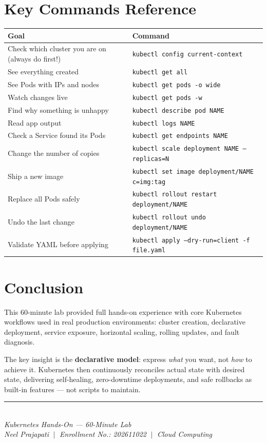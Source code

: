 \documentclass[12pt,a4paper]{report}
\begin{document}
\section*{Key Commands Reference}
\begin{center}
\begin{tabular}{ll}
\toprule
Goal & Command \\
\midrule
Check which cluster you are on (always do first!) & \texttt{kubectl config current-context} \\
See everything created                             & \texttt{kubectl get all} \\
See Pods with IPs and nodes                        & \texttt{kubectl get pods -o wide} \\
Watch changes live                                 & \texttt{kubectl get pods -w} \\
Find why something is unhappy                      & \texttt{kubectl describe pod NAME} \\
Read app output                                    & \texttt{kubectl logs NAME} \\
Check a Service found its Pods                     & \texttt{kubectl get endpoints NAME} \\
Change the number of copies                        & \texttt{kubectl scale deployment NAME --replicas=N} \\
Ship a new image                                   & \texttt{kubectl set image deployment/NAME c=img:tag} \\
Replace all Pods safely                            & \texttt{kubectl rollout restart deployment/NAME} \\
Undo the last change                               & \texttt{kubectl rollout undo deployment/NAME} \\
Validate YAML before applying                      & \texttt{kubectl apply --dry-run=client -f file.yaml} \\
\bottomrule
\end{tabular}
\end{center}

\section*{Conclusion}
This 60-minute lab provided full hands-on experience with core Kubernetes workflows used
in real production environments: cluster creation, declarative deployment, service exposure,
horizontal scaling, rolling updates, and fault diagnosis.

The key insight is the \textbf{declarative model}: express \textit{what} you want, not
\textit{how} to achieve it. Kubernetes then continuously reconciles actual state with
desired state, delivering self-healing, zero-downtime deployments, and safe rollbacks
as built-in features --- not scripts to maintain.

\vfill
\begin{center}
\rule{0.5\linewidth}{0.4pt}\\[0.3cm]
{\small \textit{Kubernetes Hands-On --- 60-Minute Lab}\\
\textit{Neel Prajapati} $\;|\;$ \textit{Enrollment No.: 202611022} $\;|\;$ \textit{Cloud Computing}}
\end{center}
\end{document}
